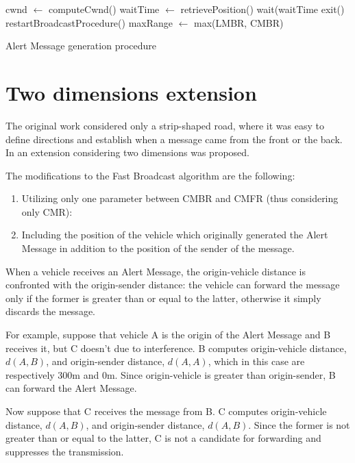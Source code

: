 		\begin{algorithm}[H]
			\begin{algorithmic}[1]
				\State cwnd $\gets$ computeCwnd()
				\State waitTime $\gets$ retrievePosition()
				\State wait(waitTime
				\State exit()
				\State restartBroadcastProcedure()
				\Else 
				\State maxRange $\gets$ max(LMBR, CMBR)
				\EndIf 
			\end{algorithmic}
			\caption{Alert Message generation procedure}
			\label{alg:alert-message-forwarding}
		\end{algorithm}
	
	\section{Two dimensions extension}
		The original work \cite{4199282} considered only a strip-shaped road, where it was easy to define directions and establish 	when a message came from the front or the back. In \cite{BAR2017} an extension considering two dimensions was proposed. 
		
		
		The modifications to the Fast Broadcast algorithm are the following:
		\begin{enumerate}
			\item Utilizing only one parameter between CMBR and CMFR (thus considering only CMR):
			\item Including the position of the vehicle which originally generated the Alert Message in addition to the position of the sender of the message.
		\end{enumerate}
		
		
		When a vehicle receives an Alert Message, the origin-vehicle distance is confronted with the origin-sender distance: the vehicle can forward the message only if the former is greater than or equal to the latter, otherwise it simply discards the message.
		
		
		For example, suppose that vehicle A is the origin of the Alert Message and B receives it, but C doesn't due to interference. B computes origin-vehicle distance, $d(A, B)$, and origin-sender distance, $d(A, A)$, which in this case are respectively 300m and 0m. Since origin-vehicle is greater than origin-sender, B can forward the Alert Message.
		
		
		Now suppose that C receives the message from B. C computes origin-vehicle distance, $d(A, B)$, and origin-sender distance, $d(A, B)$. Since the former is not greater than or equal to the latter, C is not a candidate for forwarding and suppresses the transmission.


